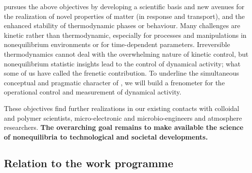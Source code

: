 \TheProject pursues the above objectives by developing a scientific basis and new avenues
for the realization of novel properties of matter (in response and transport), and the
enhanced stability of thermodynamic phases or behaviour.
%
Many challenges are kinetic rather than thermodynamic, especially for processes and
manipulations in nonequilibrium environments or for time-dependent parameters. Irreversible
thermodynamics cannot deal with the overwhelming nature of kinetic control, but
nonequilibrium statistic insights lead to the control of dynamical activity; what some of
us have called the frenetic contribution.
%
To underline the simultaneous conceptual and pragmatic character of \TheProject, we will
build a frenometer for the operational control and measurement of dynamical activity.

These objectives find further realizations in our existing contacts with colloidal and
polymer scientists, micro-electronic and microbio-engineers and atmosphere researchers. {\bf
The overarching goal remains to make available the science of nonequilibria to
technological and societal developments.}


\subsection{Relation to the work programme}\label{sec:relation-wp}

